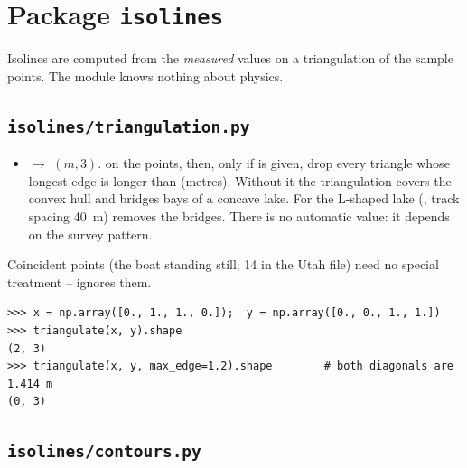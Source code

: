 \documentclass{article}
\begin{document}
\section{Package \texttt{isolines}}

Isolines are computed from the \emph{measured} values on a triangulation of the
sample points. The module knows nothing about physics.

\subsection{\texttt{isolines/triangulation.py}}

\begin{itemize}
\item {} $\to$  $(m,3)$.
       on the points, then, only if 
      is given, drop every triangle whose longest edge is longer than
       (metres). Without it the triangulation covers the convex
      hull and bridges bays of a concave lake. For the L-shaped lake
      (, track spacing 40~m)  removes the
      bridges. There is no automatic value: it depends on the survey pattern.
\end{itemize}
Coincident points (the boat standing still; 14 in the Utah file) need no
special treatment --  ignores them.
\begin{lstlisting}
>>> x = np.array([0., 1., 1., 0.]);  y = np.array([0., 0., 1., 1.])
>>> triangulate(x, y).shape
(2, 3)
>>> triangulate(x, y, max_edge=1.2).shape        # both diagonals are 1.414 m
(0, 3)
\end{lstlisting}

\subsection{\texttt{isolines/contours.py}}
\end{document}
